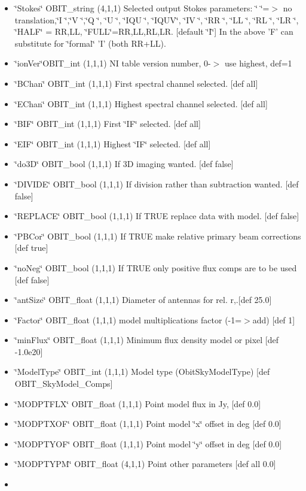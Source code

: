 \begin{itemize}
\item \char`\"{}Stokes\char`\"{} OBIT\_\-string (4,1,1) Selected output Stokes parameters: \char`\"{}    \char`\"{}=$>$ no translation,\char`\"{}I   \char`\"{},\char`\"{}V   \char`\"{},\char`\"{}Q   \char`\"{}, \char`\"{}U   \char`\"{}, \char`\"{}IQU \char`\"{}, \char`\"{}IQUV\char`\"{}, \char`\"{}IV  \char`\"{}, \char`\"{}RR  \char`\"{}, \char`\"{}LL  \char`\"{}, \char`\"{}RL  \char`\"{}, \char`\"{}LR  \char`\"{}, \char`\"{}HALF\char`\"{} = RR,LL, \char`\"{}FULL\char`\"{}=RR,LL,RL,LR. [default \char`\"{}I\char`\"{}] In the above 'F' can substitute for \char`\"{}formal\char`\"{} 'I' (both RR+LL). \item \char`\"{}ion\-Ver\char`\"{}OBIT\_\-int (1,1,1) NI table version number, 0-$>$ use highest, def=1 \item \char`\"{}BChan\char`\"{} OBIT\_\-int (1,1,1) First spectral channel selected. [def all] \item \char`\"{}EChan\char`\"{} OBIT\_\-int (1,1,1) Highest spectral channel selected. [def all] \item \char`\"{}BIF\char`\"{} OBIT\_\-int (1,1,1) First \char`\"{}IF\char`\"{} selected. [def all] \item \char`\"{}EIF\char`\"{} OBIT\_\-int (1,1,1) Highest \char`\"{}IF\char`\"{} selected. [def all] \item \char`\"{}do3D\char`\"{} OBIT\_\-bool (1,1,1) If 3D imaging wanted. [def false] \item \char`\"{}DIVIDE\char`\"{} OBIT\_\-bool (1,1,1) If division rather than subtraction wanted. [def false] \item \char`\"{}REPLACE\char`\"{} OBIT\_\-bool (1,1,1) If TRUE replace data with model. [def false] \item \char`\"{}PBCor\char`\"{} OBIT\_\-bool (1,1,1) If TRUE make relative primary beam corrections [def true] \item \char`\"{}no\-Neg\char`\"{} OBIT\_\-bool (1,1,1) If TRUE only positive flux comps are to be used [def false] \item \char`\"{}ant\-Size\char`\"{} OBIT\_\-float (1,1,1) Diameter of antennas for rel. r,.[def 25.0] \item \char`\"{}Factor\char`\"{} OBIT\_\-float (1,1,1) model multiplications factor (-1=$>$add) [def 1] \item \char`\"{}min\-Flux\char`\"{} OBIT\_\-float (1,1,1) Minimum flux density model or pixel [def -1.0e20] \item \char`\"{}Model\-Type\char`\"{} OBIT\_\-int (1,1,1) Model type (Obit\-Sky\-Model\-Type) [def OBIT\_\-Sky\-Model\_\-Comps] \item \char`\"{}MODPTFLX\char`\"{} OBIT\_\-float (1,1,1) Point model flux in Jy, [def 0.0] \item \char`\"{}MODPTXOF\char`\"{} OBIT\_\-float (1,1,1) Point model \char`\"{}x\char`\"{} offset in deg [def 0.0] \item \char`\"{}MODPTYOF\char`\"{} OBIT\_\-float (1,1,1) Point model \char`\"{}y\char`\"{} offset in deg [def 0.0] \item \char`\"{}MODPTYPM\char`\"{} OBIT\_\-float (4,1,1) Point other parameters [def all 0.0] \item 
\end{itemize}
